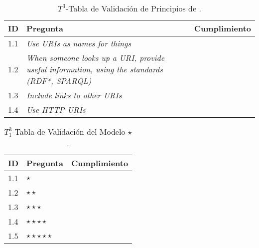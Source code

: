 \begin{table}[t]
\scriptsize
\renewcommand{\arraystretch}{1.3}
\begin{center}
\begin{tabular}[c]{|l|p{5cm}|c|} 
\hline
  \textbf{ID} & \textbf{Pregunta} &  \textbf{Cumplimiento}  \\\hline
   1.1&\textit{Use URIs as names for things} & \si  \\ \hline
   1.2&\textit{When someone looks up a URI, provide useful information, using the standards (RDF*, SPARQL)} & \si \\ \hline  
   1.3&\textit{Include links to other URIs} & \si \\ \hline    
   1.4&\textit{Use HTTP URIs} & \si \\ \hline    
   \hline
   \end{tabular}
  \caption{$T^{3}$-Tabla de Validación de Principios de \linkeddata.}
  \label{table:validation-t3}
  \end{center}
\end{table} 

\begin{table}[t]
\scriptsize
\renewcommand{\arraystretch}{1.3}
\begin{center}
\begin{tabular}[c]{|l|p{5cm}|c|} 
\hline
  \textbf{ID} & \textbf{Pregunta} &  \textbf{Cumplimiento}  \\\hline
    1.1&$\star$	& \si \\ \hline 
    1.2&$\star \star$	 & \si \\ \hline 
    1.3&$\star \star \star$	& \si  \\ \hline 
    1.4&$\star \star \star \star$ & \si \\ \hline 
   1.5&$\star \star \star \star \star$ & \si \\ \hline 
   \end{tabular}
   \caption{$T^{3}_1$-Tabla de Validación del Modelo $\star$.}
   \label{table:validation-t31}
  \end{center}
\end{table} 


